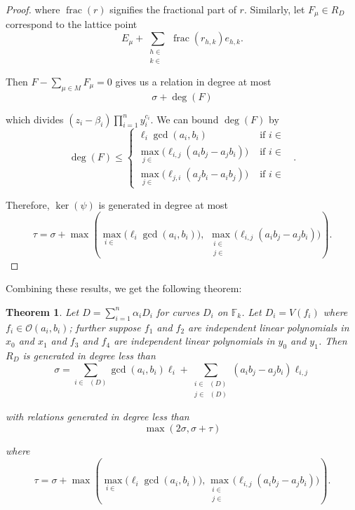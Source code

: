 \documentclass{amsart}
\theoremstyle{plain}
\newtheorem{thm}{Theorem}[section]
\theoremstyle{definition}
\theoremstyle{remark}
\numberwithin{equation}{section}
\newcommand\sco{{\mathscr O}}
\newcommand\bida{a}
\newcommand\bidb{b}
\newcommand\hirz{\mathbb{F}}
\DeclareMathOperator{\fr}{frac}
\DeclareMathOperator{\Te}{T_=}
\DeclareMathOperator{\Tp}{T_+}
\DeclareMathOperator{\Tm}{T_-}
\begin{document}
\begin{proof}
\noindent
where $\fr(r)$ signifies the fractional part of $r$.  Similarly, let $F_\mu
\in R_D$ correspond to the lattice point
\[
	E_\mu + \sum_{\substack{h \in \Tp \\ k \in \Tm}} \fr(r_{h,k}) e_{h,k}.
\]

\noindent
Then $F - \sum_{\mu \in M} F_\mu = 0$ gives us a
relation in degree at most
\[
	\sigma + \deg(F)
\]

\noindent
which divides $(z_i - \beta_i) \prod_{i = 1}^n y_i^{c_i}$.
We can bound $\deg(F)$ by
\[
	\deg(F) \le \begin{cases}
	\ell_i \gcd(\bida_i, \bidb_i)	&\mbox{ if } i \in \Te \\
	\max_{j \in \Tm} \bigl(\ell_{i, j} (\bida_i \bidb_j - \bida_j \bidb_i)\bigr)
	&\mbox{ if } i \in \Tp \\
	\max_{j \in \Tp} \bigl(\ell_{j, i} (\bida_j \bidb_ i - \bida_i \bidb_j) \bigr)
	&\mbox{ if } i \in \Tm \end{cases}.
\]

\noindent
Therefore, $\ker(\psi)$ is generated in degree at most
\[
	\tau = \sigma
	+ \max \left(\max_{i\in \Te} \bigl(\ell_i \gcd(a_i, b_i) \bigr),
	\; \max_{\substack{i \in \Tp \\ j \in \Tm}} \bigl(\ell_{i, j}
	(\bida_i \bidb_j - \bida_j
	\bidb_i) \bigr) \right).
\]
\end{proof}

Combining these results, we get the following theorem:

\begin{thm}
\label{thm:hirz-generators-relations}
Let $D = \sum_{i=1}^n \alpha_i D_i$ for curves $D_i$ on $\hirz_k$.  Let $D_i = V(f_i)$ where $f_i \in \sco(a_i, b_i)$; further suppose $f_1$ and $f_2$ are independent linear
polynomials in $x_0$ and $x_1$ and $f_3$ and $f_4$ are independent
linear polynomials in $y_0$ and $y_1$.
Then $R_D$ is generated in degree less than 
\[
	\sigma = \sum_{i\in \Te(D)} \gcd(\bida_i, \bidb_i)\ell_i +
	\sum_{\substack{i \in \Tp(D) \\	j \in \Tm(D)}} (\bida_i \bidb_j
	- \bida_j \bidb_i) \ell_{i, j}
\]

\noindent
with relations generated in degree less than 
\[
	\max(2 \sigma, \sigma + \tau)
\]

\noindent
where
\[
	\tau = \sigma
	+ \max \left( \max_{i\in \Te} \bigl(\ell_i \gcd(a_i, b_i) \bigr),
	\max_{\substack{i \in \Tp \\ j \in \Tm}} \bigl(\ell_{i, j}
	(\bida_i \bidb_j - \bida_j \bidb_i) \bigr) \right).
\]
\end{thm}
\end{document}
